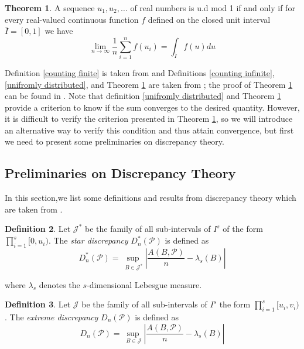 \documentclass{article}
\theoremstyle{definition}
\newtheorem{definition}{Definition}[section]
\newtheorem{theorem}[definition]{Theorem}
\begin{document}
\begin{theorem}\label{thm: criterion for QMC convergence}
    A sequence \(u_1,u_2,\ldots\) of real numbers is u.d mod 1 if and only if for every real-valued continuous function \(f\) defined on the closed unit interval \(\bar{I}=[0,1]\) we have  
    \begin{equation}
        \lim_{n\to\infty}\frac{1}{n}\sum_{i=1}^n f(u_i)=\int_{\bar{I}}f(u)du
    \end{equation}
\end{theorem}

\noindent Definition \ref{counting finite} is taken from \cite{NiederreiterHarald1992Rnga} and Definitions \ref{counting infinite}, \ref{unifromly distributed}, and Theorem \ref{thm: criterion for QMC convergence} are taken from \cite{alma991015801878809621}; the proof of Theorem \ref{thm: criterion for QMC convergence} can be found in \cite{alma991015801878809621}. Note that definition \ref{unifromly distributed} and Theorem \ref{thm: criterion for QMC convergence} provide a criterion to know if the sum converges to the desired quantity. However, it is difficult to verify the criterion presented in Theorem \ref{thm: criterion for QMC convergence}, so we will introduce an alternative way to verify this condition and thus attain convergence, but first we need to present some preliminaries on discrepancy theory. 
\subsection{Preliminaries on Discrepancy Theory}
In this section,we list some definitions and results from discrepancy theory which are taken from \cite{NiederreiterHarald1992Rnga}.
 \begin{definition}
 Let \(\mathcal{J}^{\ast}\) be the family of all sub-intervals of \({I}^{s}\) of the form \(\prod_{i=1}^{s} [0,u_i)\). The \emph{star discrepancy} \(D_n^{\ast}(\mathcal{P})\) is defined as 
\begin{equation}
     D_n^{\ast}(\mathcal{P})=\sup_{\; B\in \mathcal{J}^{\ast}}\left\lvert \frac{A(B,\mathcal{P})}{n}-\lambda_s(B)\right\rvert
\end{equation}
\end{definition}

\noindent where \(\lambda_s\) denotes the \(s\)-dimensional Lebesgue measure.

\begin{definition} 
Let \(\mathcal{J}\) be the family of all sub-intervals of \({I}^{s}\) the form \(\prod_{i=1}^{s} [u_i,v_i)\). The \emph{extreme discrepancy} \(D_n(\mathcal{P})\) is defined as 
\begin{equation}
    D_n(\mathcal{P})=\sup_{\; B\in \mathcal{J}}\left\lvert \frac{A(B,\mathcal{P})}{n}-\lambda_s(B)\right\rvert
\end{equation}
\end{definition}
\end{document}
